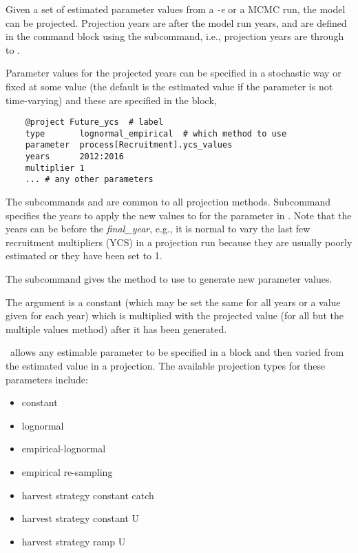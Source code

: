 Given a set of estimated parameter values from a \textit{-e} or a MCMC run, the model can be projected. Projection years are after the model run years, and are defined in the  command block using the  subcommand, i.e., projection years are  through to .

Parameter values for the projected years can be specified in a stochastic way or fixed at some value (the default is the estimated value if the parameter is not time-varying) and these are specified in the  block,

{\small{\begin{verbatim}
	@project Future_ycs  # label
	type       lognormal_empirical  # which method to use
	parameter  process[Recruitment].ycs_values
	years      2012:2016
	multiplier 1
	... # any other parameters
\end{verbatim}}}

The subcommands  and  are common to all projection methods. Subcommand  specifies the years to apply the new values to for the parameter in . Note that the years can be before the \textit{final\_year}, e.g., it is normal to vary the last few recruitment multipliers (YCS) in a projection run because they are usually poorly estimated or they have been set to 1.  

The  subcommand gives the method to use to generate new parameter values.

The argument  is a constant (which may be set the same for all years or a value given for each year) which is multiplied with the projected value (for all but the multiple values method) after it has been generated. 

\CNAME\ allows any estimable parameter to be specified in a  block and then varied from the estimated value in a projection. The available projection types for these parameters include:

\begin{itemize}
	\item constant
	\item lognormal
	\item empirical-lognormal
	\item empirical re-sampling
	\item harvest strategy constant catch
	\item harvest strategy constant U
	\item harvest strategy ramp U
\end{itemize}

